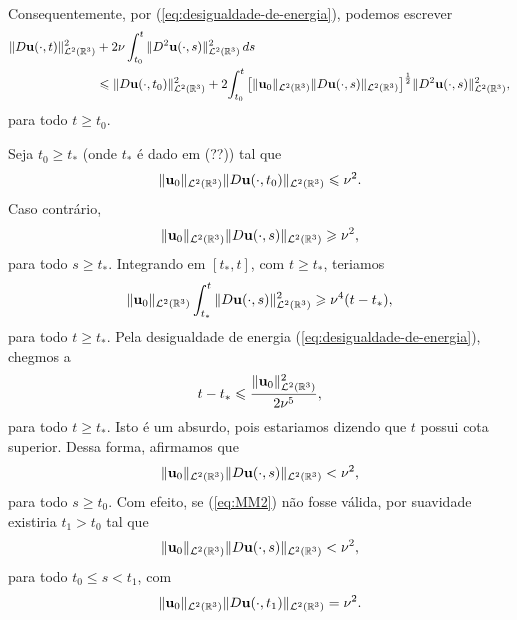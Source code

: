 \begin{prf}
\[\begin{aligned}
        \end{aligned}
    \]
    Consequentemente, por (\ref{eq:desigualdade-de-energia}), podemos escrever
    \begin{align} 
        \Vert D\mathbf{u}(\cdot,t) \Vert_{\mathcal{L}^2(\mathbb{R}^3)}^2 &+ 2 \nu \int_{t_0}^t \Vert D^2 \mathbf{u}(\cdot,s) \Vert_{\mathcal{L}^2(\mathbb{R}^3)}^2 \,ds \label{eq:maisumadesigualdade}\\ &\leqslant \Vert D\mathbf{u}(\cdot,t_0) \Vert_{\mathcal{L}^2(\mathbb{R}^3)}^2 + 2 \! \int_{t_0}^t \big[ \Vert \mathbf{u}_0 \Vert_{\mathcal{L}^2(\mathbb{R}^3)} \Vert D\mathbf{u}(\cdot,s) \Vert_{\mathcal{L}^2(\mathbb{R}^3)} \big]^\frac{1}{2} \Vert D^2\mathbf{u}(\cdot,s) \Vert_{\mathcal{L}^2(\mathbb{R}^3)}^2, \nonumber
    \end{align}
    para todo $t \geqslant t_0$. 

    Seja $t_0 \geqslant t_*$ (onde $t_*$ é dado em (??)) tal que
    \begin{equation} \label{eq:MM1}
        \Vert \mathbf{u}_0 \Vert_{\mathcal{L}^2(\mathbb{R}^3)} \Vert D\mathbf{u}(\cdot,t_0) \Vert_{\mathcal{L}^2(\mathbb{R}^3)} \leqslant \nu^2.
    \end{equation}
    Caso contrário,
    \[
        \Vert \mathbf{u}_0 \Vert_{\mathcal{L}^2(\mathbb{R}^3)} \Vert D\mathbf{u}(\cdot,s) \Vert_{\mathcal{L}^2(\mathbb{R}^3)} \geqslant \nu^2,
    \]
    para todo $s \geqslant t_*$.
    Integrando em $[t_*,t]$, com $t \geqslant t_*$, teriamos
    \[
        \Vert \mathbf{u}_0 \Vert_{\mathcal{L}^2(\mathbb{R}^3)} \int_{t_*}^{t} \Vert D\mathbf{u}(\cdot,s) \Vert_{\mathcal{L}^2(\mathbb{R}^3)}^2 \geqslant \nu^4 (t - t_*),
    \]
    para todo $t \geqslant t_*$.
    Pela desigualdade de energia (\ref{eq:desigualdade-de-energia}), chegmos a
    \[
        t - t_* \leqslant \frac{\Vert \mathbf{u}_0 \Vert_{\mathcal{L}^2(\mathbb{R}^3)}^2}{2 \nu^5},
    \]
    para todo $t \geqslant t_*$.
    Isto é um absurdo, pois estariamos dizendo que $t$ possui cota superior.
    Dessa forma, afirmamos que
    \begin{equation} \label{eq:MM2}
        \Vert \mathbf{u}_0 \Vert_{\mathcal{L}^2(\mathbb{R}^3)} \Vert D\mathbf{u}(\cdot,s) \Vert_{\mathcal{L}^2(\mathbb{R}^3)} < \nu^2,
    \end{equation}
    para todo $s \geqslant t_0$.
    Com efeito, se (\ref{eq:MM2}) não fosse válida, por suavidade existiria $t_1 > t_0$ tal que
    \begin{equation} \label{eq:MM3}
        \Vert \mathbf{u}_0 \Vert_{\mathcal{L}^2(\mathbb{R}^3)} \Vert D\mathbf{u}(\cdot,s) \Vert_{\mathcal{L}^2(\mathbb{R}^3)} < \nu^2,
    \end{equation}
    para todo $t_0 \leqslant s < t_1$, com
    \begin{equation} \label{eq:MM4}
        \Vert \mathbf{u}_0 \Vert_{\mathcal{L}^2(\mathbb{R}^3)} \Vert D\mathbf{u}(\cdot,t_1) \Vert_{\mathcal{L}^2(\mathbb{R}^3)} = \nu^2.
    \end{equation}

\end{prf}
